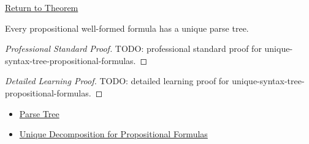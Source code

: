 \newpage
{}
\label{prf:unique-syntax-tree-propositional-formulas}

\begin{remark*}[Return]
\hyperref[thm:unique-syntax-tree-propositional-formulas]{Return to Theorem}
\end{remark*}

\begin{theorem*}
Every propositional well-formed formula has a unique parse tree.
\end{theorem*}

\begin{proof}[Professional Standard Proof]
\LRAProofBodyStart
TODO: professional standard proof for unique-syntax-tree-propositional-formulas.
\end{proof}

\begin{proof}[Detailed Learning Proof]
\LRAProofBodyStart
TODO: detailed learning proof for unique-syntax-tree-propositional-formulas.
\end{proof}

\begin{remark*}
\end{remark*}

\begin{dependencies}
\begin{itemize}
  \item \hyperref[def:parse-tree-propositional-logic]{Parse Tree}
  \item \hyperref[thm:unique-decomposition-propositional-formulas]{Unique Decomposition for Propositional Formulas}
\end{itemize}
\end{dependencies}

\clearpage
